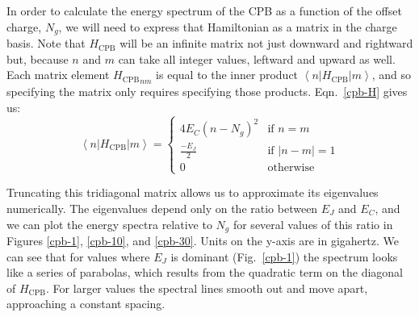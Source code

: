 \documentclass[twocolumn]{revtex4}
\newcommand{\innerp}[3]{\textstyle\left< #1 \left| #2 \right| #3 \right>}
\begin{document}
In order to calculate the energy spectrum of the CPB as a function of
the offset charge, $N_g$, we will need to express that Hamiltonian as
a matrix in the charge basis. Note that $H_{\text{CPB}}$ will be an
infinite matrix not just downward and rightward but, because $n$ and
$m$ can take all integer values, leftward and upward as well. Each
matrix element ${H_{\text{CPB}}}_{nm}$ is equal to the inner product
$\innerp{n}{H_{\text{CPB}}}{m}$, and so specifying the matrix only
requires specifying those products. Eqn.~\ref{cpb-H} gives us:
\begin{equation}
  \innerp{n}{H_{\text{CPB}}}{m} = 
  \begin{cases}
    4E_C(n-N_g)^2 & \text{if $n=m$} \\
    \frac{-E_J}{2} & \text{if $|n-m|=1$}\\
    0 & \text{otherwise}
  \end{cases}
\end{equation}

Truncating this tridiagonal matrix allows us to approximate its
eigenvalues numerically. The eigenvalues depend only on the ratio
between $E_J$ and $E_C$, and we can plot the energy spectra relative
to $N_g$ for several values of this ratio in Figures \ref{cpb-1},
\ref{cpb-10}, and \ref{cpb-30}. Units on the y-axis are in
gigahertz. We can see that for values where $E_J$ is dominant
(Fig.~\ref{cpb-1}) the spectrum looks like a series of parabolas,
which results from the quadratic term on the diagonal of
$H_{\text{CPB}}$. For larger values the spectral lines smooth out and
move apart, approaching a constant spacing.
\end{document}
